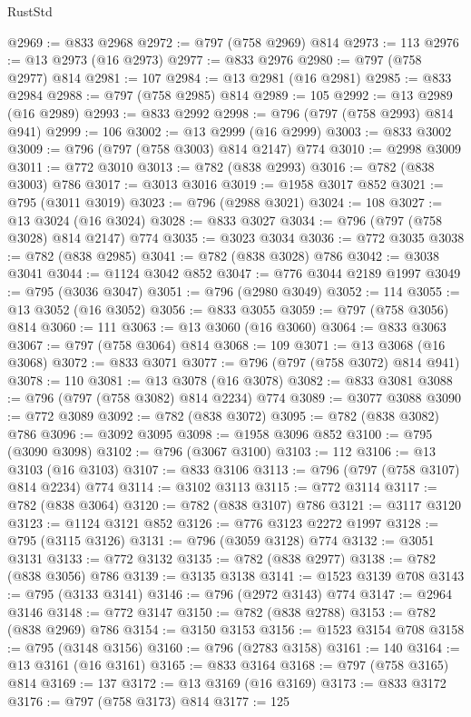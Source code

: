 \begin{lexlean}{RustStd}
\begin{coremodule}
@2969 := @833 @2968
@2972 := @797 (@758 @2969) @814
@2973 := 113
@2976 := @13 @2973 (@16 @2973)
@2977 := @833 @2976
@2980 := @797 (@758 @2977) @814
@2981 := 107
@2984 := @13 @2981 (@16 @2981)
@2985 := @833 @2984
@2988 := @797 (@758 @2985) @814
@2989 := 105
@2992 := @13 @2989 (@16 @2989)
@2993 := @833 @2992
@2998 := @796 (@797 (@758 @2993) @814 @941)
@2999 := 106
@3002 := @13 @2999 (@16 @2999)
@3003 := @833 @3002
@3009 := @796 (@797 (@758 @3003) @814 @2147) @774
@3010 := @2998 @3009
@3011 := @772 @3010
@3013 := @782 (@838 @2993)
@3016 := @782 (@838 @3003) @786
@3017 := @3013 @3016
@3019 := @1958 @3017 @852
@3021 := @795 (@3011 @3019)
@3023 := @796 (@2988 @3021)
@3024 := 108
@3027 := @13 @3024 (@16 @3024)
@3028 := @833 @3027
@3034 := @796 (@797 (@758 @3028) @814 @2147) @774
@3035 := @3023 @3034
@3036 := @772 @3035
@3038 := @782 (@838 @2985)
@3041 := @782 (@838 @3028) @786
@3042 := @3038 @3041
@3044 := @1124 @3042 @852
@3047 := @776 @3044 @2189 @1997
@3049 := @795 (@3036 @3047)
@3051 := @796 (@2980 @3049)
@3052 := 114
@3055 := @13 @3052 (@16 @3052)
@3056 := @833 @3055
@3059 := @797 (@758 @3056) @814
@3060 := 111
@3063 := @13 @3060 (@16 @3060)
@3064 := @833 @3063
@3067 := @797 (@758 @3064) @814
@3068 := 109
@3071 := @13 @3068 (@16 @3068)
@3072 := @833 @3071
@3077 := @796 (@797 (@758 @3072) @814 @941)
@3078 := 110
@3081 := @13 @3078 (@16 @3078)
@3082 := @833 @3081
@3088 := @796 (@797 (@758 @3082) @814 @2234) @774
@3089 := @3077 @3088
@3090 := @772 @3089
@3092 := @782 (@838 @3072)
@3095 := @782 (@838 @3082) @786
@3096 := @3092 @3095
@3098 := @1958 @3096 @852
@3100 := @795 (@3090 @3098)
@3102 := @796 (@3067 @3100)
@3103 := 112
@3106 := @13 @3103 (@16 @3103)
@3107 := @833 @3106
@3113 := @796 (@797 (@758 @3107) @814 @2234) @774
@3114 := @3102 @3113
@3115 := @772 @3114
@3117 := @782 (@838 @3064)
@3120 := @782 (@838 @3107) @786
@3121 := @3117 @3120
@3123 := @1124 @3121 @852
@3126 := @776 @3123 @2272 @1997
@3128 := @795 (@3115 @3126)
@3131 := @796 (@3059 @3128) @774
@3132 := @3051 @3131
@3133 := @772 @3132
@3135 := @782 (@838 @2977)
@3138 := @782 (@838 @3056) @786
@3139 := @3135 @3138
@3141 := @1523 @3139 @708
@3143 := @795 (@3133 @3141)
@3146 := @796 (@2972 @3143) @774
@3147 := @2964 @3146
@3148 := @772 @3147
@3150 := @782 (@838 @2788)
@3153 := @782 (@838 @2969) @786
@3154 := @3150 @3153
@3156 := @1523 @3154 @708
@3158 := @795 (@3148 @3156)
@3160 := @796 (@2783 @3158)
@3161 := 140
@3164 := @13 @3161 (@16 @3161)
@3165 := @833 @3164
@3168 := @797 (@758 @3165) @814
@3169 := 137
@3172 := @13 @3169 (@16 @3169)
@3173 := @833 @3172
@3176 := @797 (@758 @3173) @814
@3177 := 125

\end{coremodule}
\end{lexlean}
